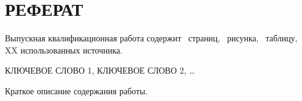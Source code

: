\chapter*{РЕФЕРАТ}


%

%
%
%
%

\par
Выпускная квалификационная работа содержит \pageref*{LastPage}~страниц, \totfig~рисунка,                                        \tottab~таблицу, XX использованных источника.
\bigskip

\par
КЛЮЧЕВОЕ СЛОВО 1, КЛЮЧЕВОЕ СЛОВО 2, …
\bigskip


\par
Краткое описание содержания работы.

